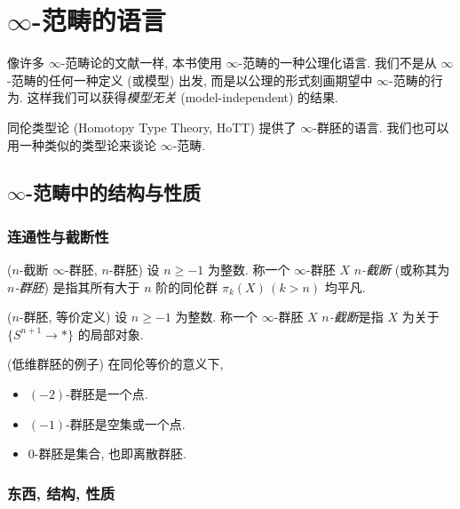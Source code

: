 \chapter{$\infty$-范畴的语言}



像许多 $\infty$-范畴论的文献一样, 本书使用 $\infty$-范畴的一种公理化语言. 我们不是从 $\infty$-范畴的任何一种定义 (或模型) 出发, 而是以公理的形式刻画期望中 $\infty$-范畴的行为. 这样我们可以获得\emph{模型无关} (model-independent) 的结果.


同伦类型论 (Homotopy Type Theory, HoTT) 提供了 $\infty$-群胚的语言. 我们也可以用一种类似的类型论来谈论 $\infty$-范畴.

\section{$\infty$-范畴中的结构与性质}

\subsection{连通性与截断性}


\begin{definition}
	{($n$-截断 $\infty$-群胚, $n$-群胚)}
	设 $n\geq -1$ 为整数. 称一个 $\infty$-群胚 $X$  \emph{$n$-截断} (或称其为 \emph{$n$-群胚}) 是指其所有大于 $n$ 阶的同伦群 $\pi_k(X)\,(k>n)$ 均平凡.
\end{definition}

\begin{definition}
	{($n$-群胚, 等价定义)}
	设 $n\geq -1$ 为整数. 称一个 $\infty$-群胚 $X$  \emph{$n$-截断}是指 $X$ 为关于 $\{S^{n+1}\to *\}$ 的局部对象.
\end{definition}

\begin{example}
	{(低维群胚的例子)}
	在同伦等价的意义下,
	\begin{itemize}
		\item $(-2)$-群胚是一个点.
		\item $(-1)$-群胚是空集或一个点.
		\item $0$-群胚是集合, 也即离散群胚.
	\end{itemize}
\end{example}

\subsection{东西, 结构, 性质}

